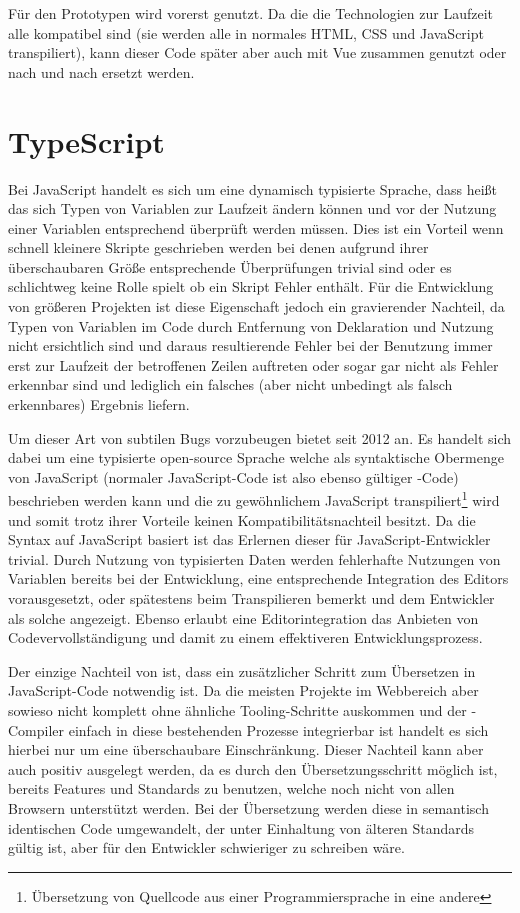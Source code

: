 Für den Prototypen wird vorerst  genutzt. Da die die Technologien zur Laufzeit alle kompatibel sind (sie werden alle in normales HTML, CSS und JavaScript transpiliert), kann dieser Code später aber auch mit Vue zusammen genutzt oder nach und nach ersetzt werden.

\section{TypeScript}
Bei JavaScript handelt es sich um eine dynamisch typisierte Sprache, dass heißt das sich Typen von Variablen zur Laufzeit ändern können und vor der Nutzung einer Variablen entsprechend überprüft werden müssen. Dies ist ein Vorteil wenn schnell kleinere Skripte geschrieben werden bei denen aufgrund ihrer überschaubaren Größe entsprechende Überprüfungen trivial sind oder es schlichtweg keine Rolle spielt ob ein Skript Fehler enthält. Für die Entwicklung von größeren Projekten ist diese Eigenschaft jedoch ein gravierender Nachteil, da Typen von Variablen im Code durch Entfernung von Deklaration und Nutzung nicht ersichtlich sind und daraus resultierende Fehler bei der Benutzung immer erst zur Laufzeit der betroffenen Zeilen auftreten oder sogar gar nicht als Fehler erkennbar sind und lediglich ein falsches (aber nicht unbedingt als falsch erkennbares) Ergebnis liefern.   

Um dieser Art von subtilen Bugs vorzubeugen bietet  seit 2012  an. Es handelt sich dabei um eine typisierte open-source Sprache welche als syntaktische Obermenge von JavaScript (normaler JavaScript-Code ist also ebenso gültiger -Code) beschrieben werden kann und die zu gewöhnlichem JavaScript transpiliert\footnote{Übersetzung von Quellcode aus einer Programmiersprache in eine andere} wird und somit trotz ihrer Vorteile keinen Kompatibilitätsnachteil besitzt. Da die Syntax auf JavaScript basiert ist das Erlernen dieser für JavaScript-Entwickler trivial. Durch Nutzung von typisierten Daten werden fehlerhafte Nutzungen von Variablen bereits bei der Entwicklung, eine entsprechende Integration des Editors vorausgesetzt, oder spätestens beim Transpilieren bemerkt und dem Entwickler als solche angezeigt. Ebenso erlaubt eine Editorintegration das Anbieten von Codevervollständigung und damit zu einem effektiveren Entwicklungsprozess.

Der einzige Nachteil von  ist, dass ein zusätzlicher Schritt zum Übersetzen in JavaScript-Code notwendig ist. Da die meisten Projekte im Webbereich aber sowieso nicht komplett ohne ähnliche Tooling-Schritte auskommen und der -Compiler einfach in diese bestehenden Prozesse integrierbar ist handelt es sich hierbei nur um eine überschaubare Einschränkung. Dieser Nachteil kann aber auch positiv ausgelegt werden, da es durch den Übersetzungsschritt möglich ist, bereits Features und Standards zu benutzen, welche noch nicht von allen Browsern unterstützt werden. Bei der Übersetzung werden diese in semantisch identischen Code umgewandelt, der unter Einhaltung von älteren Standards gültig ist, aber für den Entwickler schwieriger zu schreiben wäre. 

